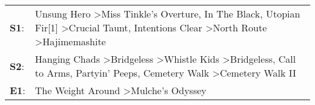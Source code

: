 \begin{supertabular}{p{0.03\textwidth}p{0.92\textwidth}}
 \textbf{S1}:  &  Unsung Hero\textsuperscript{} \textgreater \enspace Miss Tinkle's Overture\textsuperscript{}, \enspace In The Black\textsuperscript{}, \enspace Utopian Fir[1]\textsuperscript{} \textgreater \enspace Crucial Taunt\textsuperscript{}, \enspace Intentions Clear\textsuperscript{} \textgreater \enspace North Route\textsuperscript{} \textgreater \enspace Hajimemashite\textsuperscript{}  \enspace  \\
 \textbf{S2}:  &              Hanging Chads\textsuperscript{} \textgreater \enspace Bridgeless\textsuperscript{} \textgreater \enspace Whistle Kids\textsuperscript{} \textgreater \enspace Bridgeless\textsuperscript{}, \enspace Call to Arms\textsuperscript{}, \enspace Partyin' Peeps\textsuperscript{}, \enspace Cemetery Walk\textsuperscript{} \textgreater \enspace Cemetery Walk II\textsuperscript{}  \enspace  \\
 \textbf{E1}:  &                                                                                                                                                                                                                                                                                                   The Weight Around\textsuperscript{} \textgreater \enspace Mulche's Odyssey\textsuperscript{}  \enspace  \\
\end{supertabular}
